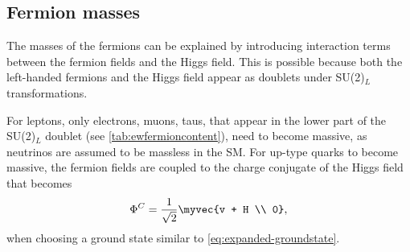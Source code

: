 




\subsection{Fermion masses}
The masses of the fermions can be explained by introducing interaction terms between the fermion fields and the Higgs field. 
This is possible because both the left-handed fermions and the Higgs field appear as doublets under SU(2)$_L$ transformations.

For leptons, only electrons, muons, taus, that appear in the lower part of the SU(2)$_L$ doublet (see \cref{tab:ewfermioncontent}), need to become massive, as neutrinos are assumed to be massless in the SM.
For up-type quarks to become massive, the fermion fields are coupled to the charge conjugate of the Higgs field that becomes
\begin{equation}
  \Phi^C = \frac{1}{\sqrt{2}} \myvec{v + H \\ 0},
\end{equation}
when choosing a ground state similar to \cref{eq:expanded-groundstate}.

